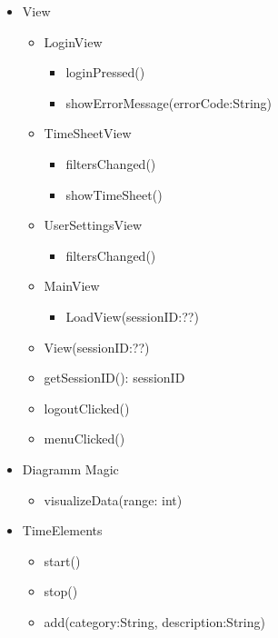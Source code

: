         \begin{itemize}
            \item{View}
                \begin{itemize}
                    \item{LoginView}
                    \begin{itemize}
                        \item{loginPressed()}
                        \item{showErrorMessage(errorCode:String)}
                    \end{itemize}

                    \item{TimeSheetView}
                    \begin{itemize}
                        \item{filtersChanged()}
                        \item{showTimeSheet()}
                    \end{itemize}

                    \item{UserSettingsView}
                    \begin{itemize}
                        \item{filtersChanged()}
                    \end{itemize}

                    \item{MainView}
                    \begin{itemize}
                        \item{LoadView(sessionID:??)}
                    \end{itemize}

                \end{itemize}
                \begin{itemize}
                    \item{View(sessionID:??)}
                    \item{getSessionID(): sessionID}
                    \item{logoutClicked()}
                    \item{menuClicked()}
                \end{itemize}

            \item{Diagramm Magic}
            \begin{itemize}
                \item{visualizeData(range: int)}
            \end{itemize}

            \item{TimeElements}
            \begin{itemize}
                \item{start()}
                \item{stop()}
                \item{add(category:String, description:String)}
            \end{itemize}

        \end{itemize}